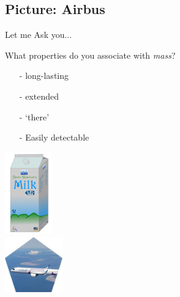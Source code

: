    \subsection{Picture: Airbus}
\begin{frame}{Let me Ask you...}
\begin{minipage}{0.1\textwidth}
    \quad
\end{minipage}
            \begin{minipage}[t]{0.49\textwidth}
      \vspace{1cm} 
      What properties do you associate with \emph{mass}? %
      
      \begin{center}
        \begin{itemize}
             \item[-] long-lasting
            \item [-] extended
            \item [-]‘there’
            \item [-] Easily detectable
        \end{itemize}
         \end{center}
      \end{minipage}
      \begin{minipage}[t]{0.29\textwidth}
     \centering
     \vspace{+.1cm}
         \includegraphics[width=2cm]{Figures Lecture on Hadrons/SevenMountainsMilk.png}\\ \vspace{.5cm}
         \includegraphics[width=2.5cm]{Figures Lecture on Hadrons/Airbus A321Neo.jpg}
           \end{minipage} 
 \end{frame}
